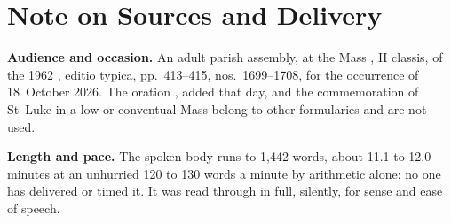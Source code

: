 
\section*{Note on Sources and Delivery}

{\footnotesize

\textbf{Audience and occasion.} An adult parish assembly, at the Mass
, II classis, of the 1962
, editio typica, pp.~413--415, nos.~1699--1708, for the
occurrence of 18~October 2026. The oration ,
added that day, and the commemoration of St~Luke in a low or conventual Mass
belong to other formularies and are not used.

\textbf{Length and pace.} The spoken body runs to 1,442 words, about 11.1 to
12.0 minutes at an unhurried 120 to 130 words a minute by arithmetic alone; no
one has delivered or timed it. It was read through in full, silently, for sense
and ease of speech.

}
